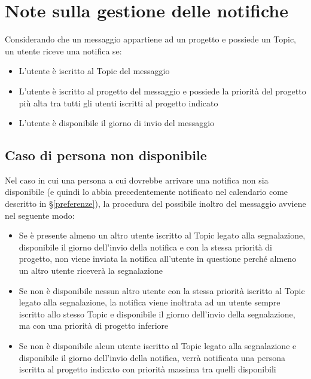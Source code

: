 \section{Note sulla gestione delle notifiche}\label{note}
Considerando che un messaggio appartiene ad un progetto e possiede un  Topic, un utente riceve una notifica se:
\begin{itemize}
    \item L'utente è iscritto al Topic del messaggio
    \item L'utente è iscritto al progetto del messaggio e possiede la priorità del progetto più alta tra tutti gli utenti iscritti al progetto indicato
    \item L'utente è disponibile il giorno di invio del messaggio
\end{itemize}

\subsection{Caso di persona non disponibile}
Nel caso in cui una persona a cui dovrebbe arrivare una notifica non sia disponibile (e quindi lo abbia precedentemente notificato nel calendario come descritto in \S\ref{preferenze}), la procedura del possibile inoltro del messaggio avviene nel seguente modo:
\begin{itemize}
    \item Se è presente almeno un altro utente iscritto al Topic legato alla segnalazione, disponibile
    il giorno dell’invio della notifica e con la stessa priorità di progetto, non viene inviata la
    notifica all’utente in questione perché almeno un altro utente riceverà la segnalazione
    \item Se non è disponibile nessun altro utente con la stessa priorità iscritto al Topic legato alla
    segnalazione, la notifica viene inoltrata ad un utente sempre iscritto allo stesso Topic e
    disponibile il giorno dell’invio della segnalazione, ma con una priorità di progetto inferiore
    \item Se non è disponibile alcun utente iscritto al Topic legato alla segnalazione e disponibile
    il giorno dell’invio della notifica, verrà notificata una persona iscritta al progetto indicato
    con priorità massima tra quelli disponibili
\end{itemize}
